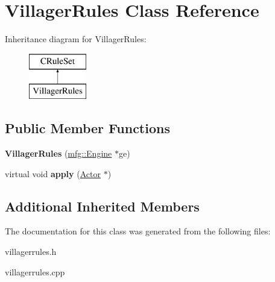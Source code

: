 \hypertarget{class_villager_rules}{}\section{Villager\+Rules Class Reference}
\label{class_villager_rules}
Inheritance diagram for Villager\+Rules\+:\begin{figure}[H]
\begin{center}
\leavevmode
\includegraphics[height=2.000000cm]{class_villager_rules}
\end{center}
\end{figure}
\subsection*{Public Member Functions}
\begin{DoxyCompactItemize}
\item 
\mbox{\label{class_villager_rules_a7c23dd17126f9d1c1e1b9ada7f965bff}} 
{\bfseries Villager\+Rules} (\hyperlink{classmfg_1_1_engine}{mfg\+::\+Engine} $\ast$ge)
\item 
\mbox{\label{class_villager_rules_ac78c4a1461517c37bd860033a82b75d3}} 
virtual void {\bfseries apply} (\hyperlink{class_actor}{Actor} $\ast$)
\end{DoxyCompactItemize}
\subsection*{Additional Inherited Members}


The documentation for this class was generated from the following files\+:\begin{DoxyCompactItemize}
\item 
villagerrules.\+h\item 
villagerrules.\+cpp\end{DoxyCompactItemize}
